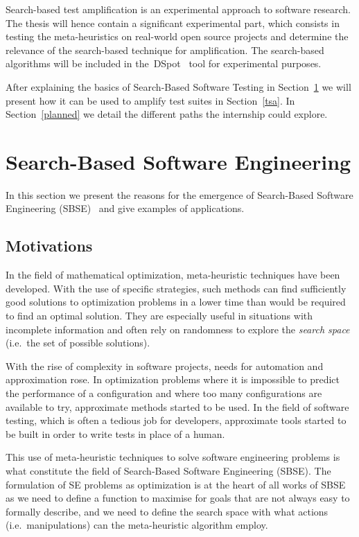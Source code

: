 \documentclass[11pt]{sdm}
\newcommand{\dspot}{DSpot\xspace}
\begin{document}
Search-based test amplification is an experimental approach to software research.
The thesis will hence contain a significant experimental part, which consists in testing the meta-heuristics on real-world open source projects and determine the relevance of the search-based technique for amplification.
The search-based algorithms will be included in the~\dspot{}~\cite{baudry2015dspot} tool for experimental purposes.

After explaining the basics of Search-Based Software Testing in Section~\ref{sbse} we will present how it can be used to amplify test suites in Section~\ref{tsa}.
In Section~\ref{planned} we detail the different paths the internship could explore.


\section{Search-Based Software Engineering}
\label{sbse}

In this section we present the reasons for the emergence of Search-Based Software Engineering (SBSE)~\cite{harman2001search,mcminn2011search} and give examples of applications.

\subsection{Motivations}
\label{motiv}
In the field of mathematical optimization, meta-heuristic techniques have been developed.
With the use of specific strategies, such methods can find sufficiently good solutions to optimization problems in a lower time than would be required to find an optimal solution.
They are especially useful in situations with incomplete information and often rely on randomness to explore the \textit{search space} (i.e.\ the set of possible solutions).

With the rise of complexity in software projects, needs for automation and approximation rose.
In optimization problems where it is impossible to predict the performance of a configuration and where too many configurations are available to try, approximate methods started to be used.
In the field of software testing, which is often a tedious job for developers, approximate tools started to be built in order to write tests in place of a human.

This use of meta-heuristic techniques to solve software engineering problems is what constitute the field of Search-Based Software Engineering (SBSE).
The formulation of SE problems as optimization is at the heart of all works of SBSE as we need to define a function to maximise for goals that are not always easy to formally describe, and we need to define the search space with what actions (i.e.\ manipulations) can the meta-heuristic algorithm employ.
\end{document}

